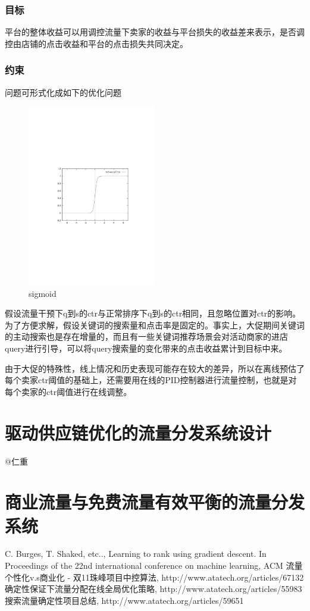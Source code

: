 \subsubsection{目标}
平台的整体收益可以用调控流量下卖家的收益与平台损失的收益差来表示，是否调控由店铺的点击收益和平台的点击损失共同决定。
\subsubsection{约束}
问题可形式化成如下的优化问题
\begin{figure}[htbp]
  \centering
  \includegraphics[width=0.5\textwidth]{pic/chap8/cp8p1.pdf}
  \caption{sigmoid}\label{fig:digit}
\end{figure}
假设流量干预下q到s的ctr与正常排序下q到s的ctr相同，且忽略位置对ctr的影响。
为了方便求解，假设关键词的搜索量和点击率是固定的。事实上，大促期间关键词的主动搜索也是存在增量的，而且有一些关键词推荐场景会对活动商家的进店query进行引导，可以将query搜索量的变化带来的点击收益累计到目标中来。

由于大促的特殊性，线上情况和历史表现可能存在较大的差异，所以在离线预估了每个卖家ctr阈值的基础上，还需要用在线的PID控制器进行流量控制，也就是对每个卖家的ctr阈值进行在线调整。


\section{驱动供应链优化的流量分发系统设计} 
@仁重

\section{商业流量与免费流量有效平衡的流量分发系统} 


\begin{thebibliography}{99}
 C. Burges, T. Shaked, etc.., Learning to rank 
using gradient descent. In Proceedings of the 22nd international 
conference on machine learning, ACM
 流量个性化v.s商业化 - 双11珠峰项目中控算法, http://www.atatech.org/articles/67132
 确定性保证下流量分配在线全局优化策略, http://www.atatech.org/articles/55983
 搜索流量确定性项目总结, http://www.atatech.org/articles/59651
\end{thebibliography}

 
